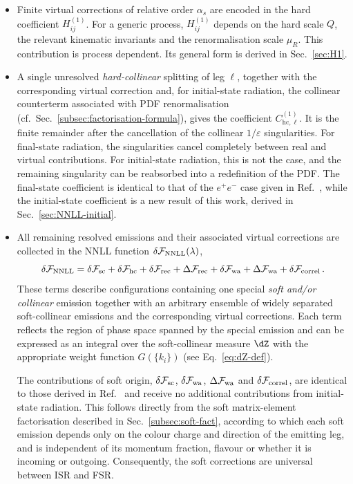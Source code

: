 \begin{itemize}
\item Finite virtual corrections of relative order $\alpha_s$ are
encoded in the hard coefficient $H_{ij}^{(1)}$. For a generic process,
$H_{ij}^{(1)}$ depends on the hard scale $Q$, the relevant kinematic
invariants and the renormalisation scale $\mu_R$. This contribution is
process dependent. Its general form is derived in Sec.~\ref{sec:H1}.

\item A single unresolved \emph{hard-collinear} splitting of leg
$\ell$, together with the corresponding virtual correction and, for
initial-state radiation, the collinear counterterm associated with PDF
renormalisation (cf.~Sec.~\ref{subsec:factorisation-formula}), gives
the coefficient $C_{\mathrm{hc},\ell}^{(1)}$. It is the finite
remainder after the cancellation of the collinear
$1/\varepsilon$ singularities. For final-state radiation, the
singularities cancel completely between real and virtual contributions.
For initial-state radiation, this is not the case, and the remaining singularity 
can be reabsorbed into a redefinition of the PDF. 
The final-state coefficient is identical to that of the
$e^+e^-$ case given in Ref.~\cite{Arpino:2019ozn}, while the
initial-state coefficient is a new result of this work, derived in
Sec.~\ref{sec:NNLL-initial}.
  
  \item All remaining resolved emissions and their associated virtual
  corrections are collected in the NNLL function
  $\delta\mathcal{F}_{\rm NNLL}(\lambda)$,
     \begin{equation}
    \label{eq:dFNNLL}
    \delta\mathcal{F}_{\rm NNLL} =
    \delta\mathcal{F}_{\rm sc}
    +\delta\mathcal{F}_{\rm hc}
    +\delta\mathcal{F}_{\rm rec}
    +\Delta\mathcal{F}_{\rm rec}
    +\delta\mathcal{F}_{\rm wa}
    +\Delta\mathcal{F}_{\rm wa}
    +\delta\mathcal{F}_{\rm correl}\,.
  \end{equation}
  These terms describe configurations containing one special
  \emph{soft and/or collinear} emission together with an arbitrary
  ensemble of widely separated soft-collinear emissions and the
  corresponding virtual corrections.
  Each term reflects the region of phase space spanned by the special emission
  and can be expressed as an integral over the soft-collinear measure $\dZ$ with the appropriate weight function $G(\{k_i\})$ 
  (see Eq.~\eqref{eq:dZ-def}). 

The contributions of soft origin,
$\delta\mathcal{F}_{\rm sc}$, $\delta\mathcal{F}_{\rm wa}$,
$\Delta\mathcal{F}_{\rm wa}$ and $\delta\mathcal{F}_{\rm correl}$,
are identical to those derived in Ref.~\cite{Arpino:2019ozn}
and receive no additional contributions from initial-state radiation.
This follows directly from the soft matrix-element factorisation
described in Sec.~\ref{subsec:soft-fact}, according to which each 
soft emission depends only on the colour charge and direction of the emitting leg, 
and is independent of its momentum fraction, flavour or whether it is incoming or 
outgoing. Consequently, the soft corrections are universal between ISR and FSR.


\end{itemize}
